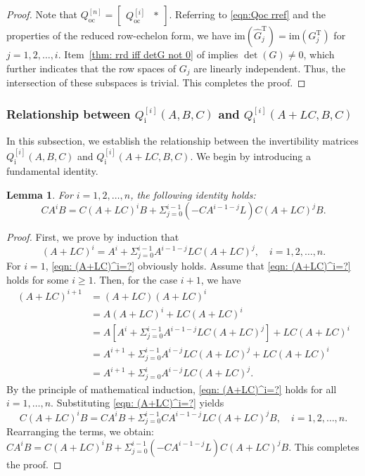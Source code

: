 \documentclass[sort&compress]{elsarticle}
\newtheorem{lemma}{Lemma}
\newcommand\Qi{Q_\mathrm i}
\newcommand\Qoc{Q_\mathrm{oc}}
\newcommand\im{\mathrm{im}}
\newcommand\T{\mathrm T}
\begin{document}
\begin{proof}
Note that $\Qoc^{[n]} = \begin{bmatrix} \Qoc^{[i]} & * \end{bmatrix}$.
Referring to \eqref{eqn:Qoc rref} and the properties of the reduced row-echelon form,
we have $\im(\hat G_j^\T) = \im(G_j^\T)$ for $j=1,2,\dots,i$.
Item~\ref{thm: rrd iff detG not 0} of  implies $\det(G) \neq 0$,
which further indicates that the row spaces of $G_j$ are linearly independent.
Thus, the intersection of these subspaces is trivial.
This completes the proof.
\end{proof}

\subsubsection{Relationship between $\Qi^{[i]}(A,B,C)$ and $\Qi^{[i]}(A+LC,B,C)$}

In this subsection, we establish the relationship between the invertibility matrices
$\Qi^{[i]}(A,B,C)$ and $\Qi^{[i]}(A+LC,B,C)$.
We begin by introducing a fundamental identity.

\begin{lemma}\label{thm: CA^iB=?}
For $i=1,2,\dots,n$, the following identity holds:
\[
CA^iB = C(A+LC)^iB + \Sigma_{j=0}^{i-1}(-CA^{i-1-j}L)C(A+LC)^jB.
\]
\end{lemma}

\begin{proof}
First, we prove by induction that
\begin{equation}\label{eqn: (A+LC)^i=?}
(A+LC)^i = A^i + \Sigma_{j=0}^{i-1}A^{i-1-j}LC(A+LC)^j,
\quad i=1,2,\dots,n.
\end{equation}
For $i=1$, \eqref{eqn: (A+LC)^i=?} obviously holds.
Assume that \eqref{eqn: (A+LC)^i=?} holds for some $i \ge 1$.
Then, for the case $i+1$, we have
\begin{align*}
(A+LC)^{i+1} &= (A+LC)(A+LC)^i\\
&= A(A+LC)^i + LC(A+LC)^i\\
&= A\left[A^i + \Sigma_{j=0}^{i-1}A^{i-1-j}LC(A+LC)^j\right] + LC(A+LC)^i\\
&= A^{i+1} + \Sigma_{j=0}^{i-1}A^{i-j}LC(A+LC)^j + LC(A+LC)^i\\
&= A^{i+1} + \Sigma_{j=0}^i A^{i-j}LC(A+LC)^j.
\end{align*}
By the principle of mathematical induction, \eqref{eqn: (A+LC)^i=?} holds for all $i=1,\dots,n$.
Substituting \eqref{eqn: (A+LC)^i=?} yields
\[
C(A+LC)^iB = CA^iB + \Sigma_{j=0}^{i-1}CA^{i-1-j}LC(A+LC)^jB,
\quad i=1,2,\dots,n.
\]
Rearranging the terms, we obtain:
$CA^iB = C(A+LC)^iB + \Sigma_{j=0}^{i-1}(-CA^{i-1-j}L)C(A+LC)^jB$.
This completes the proof.
\end{proof}
\end{document}
